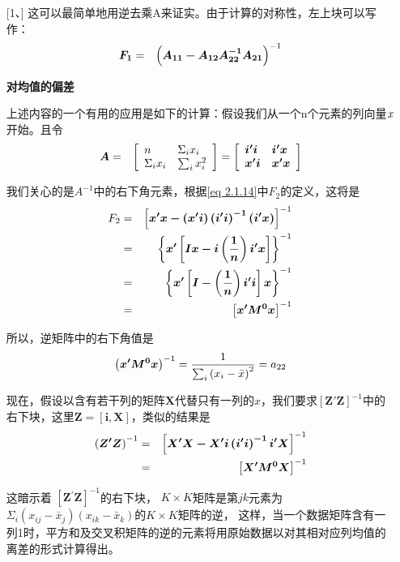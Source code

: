 \begin{enumerate} [1、]
		这可以最简单地用逆去乘A来证实。由于计算的对称性，左上块可以写作：
		\begin{eqnarray}
			\boldsymbol{F_{1}} & = & \left( \boldsymbol{ A_{11}-A_{12} A_{22}^{-1} A_{21} }\right)^{-1} \notag
		\end{eqnarray}
		
		{\bf 对均值的偏差}
		
		上述内容的一个有用的应用是如下的计算：假设我们从一个n个元素的列向量$ \it x $开始。且令
		\begin{eqnarray}
			\boldsymbol{A} & = & \left[
			\begin{array}{ll}
				n & \Sigma_{i} x_{i} \\
				\Sigma_{i} x_{i} & \sum_{i} x_{i}^{2}
			\end{array}\right] 
		=\left[\begin{array}{ll}
			\boldsymbol{i^{\prime} i} & \boldsymbol{i^{\prime} x} \\
			\boldsymbol{x^{\prime} i} & \boldsymbol{x^{\prime} x}
		\end{array}\right] \notag
		\end{eqnarray}
		
		我们关心的是$ A^{-1} $中的右下角元素，根据\eqref{eq 2.1.14}中$F_2$的定义，这将是
		\begin{eqnarray}
		F_{2}  & = & \left[ \boldsymbol{ x^{\prime} x-\left(x^{\prime} i\right)\left(i^{\prime} i\right)^{-1}\left(i^{\prime} x\right)}\right]^{-1} \notag \\
		& = & \left\{ \boldsymbol{x^{\prime}\left[I x-i\left(\frac{1}{n}\right) i^{\prime} x\right] }\right\}^{-1} \notag \\
		& = & \left\{ \boldsymbol{x^{\prime}\left[I-\left(\frac{1}{n}\right) i^{\prime} i\right] x}\right\}^{-1} \notag \\
		& = & \left[ \boldsymbol{x^{\prime} M^{0} x }\right]^{-1} \notag
		\end{eqnarray}
		
		所以，逆矩阵中的右下角值是
		\begin{eqnarray}
			\left( \boldsymbol{x^{\prime} M^{0} x} \right)^{-1}  =  \dfrac{1}{\sum_{i}\left(x_{i}-\bar{x}\right)^{2}}  =  a_{22}  \notag
		\end{eqnarray}
		
		现在，假设以含有若干列的矩阵$ \boldsymbol{X} $代替只有一列的$x$，我们要求$ \boldsymbol{[Z′Z]}^{-1} $中的右下块，这里$ \boldsymbol{ Z=[i,X] }$，类似的结果是
		\begin{eqnarray}
		\left( \boldsymbol{ Z^{\prime} Z }\right)^{-1} & = & \left[ \boldsymbol{ X^{\prime} X-X^{\prime} i\left(i^{\prime} i\right)^{-1} i^{\prime} X }\right]^{-1} \\ & = & \left[ \boldsymbol{ X^{\prime} M^{0} X }\right]^{-1} \notag
		\end{eqnarray}
		
		这暗示着
		$ [ \boldsymbol{ Z{^{\prime}}Z }]^{-1} $的右下块， $ K \times K $矩阵是第$ jk $元素为$ \Sigma_{i}\left(x_{i j}-\bar{x}_{j}\right)
		\left(x_{i k}-\bar{x}_{k}\right) $的$ K \times K $矩阵的逆，
		这样，当一个数据矩阵含有一列1时，平方和及交叉积矩阵的逆的元素将用原始数据以对其相对应列均值的离差的形式计算得出。
		
\end{enumerate}